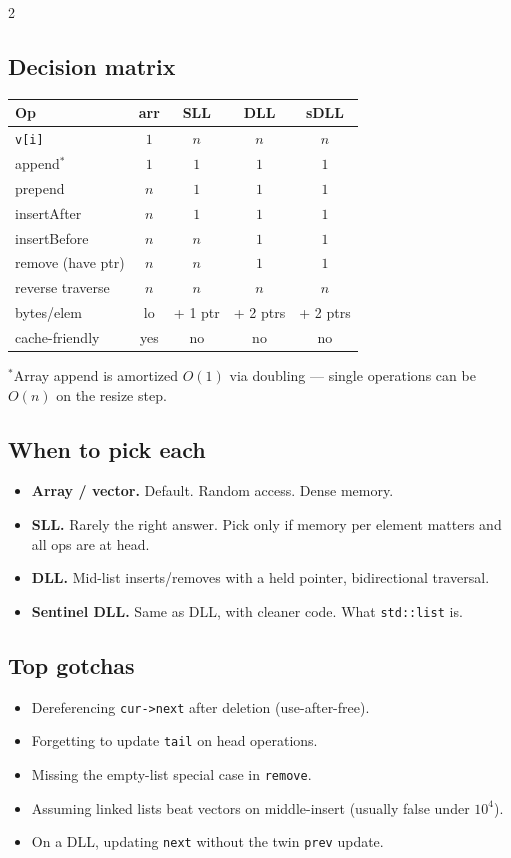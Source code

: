 \documentclass[10pt]{article}
\begin{document}
\begin{multicols}{2}
\subsection*{Decision matrix}
\begin{tabular}{@{}l|cccc@{}}
\textbf{Op} & \textbf{arr} & \textbf{SLL} & \textbf{DLL} & \textbf{sDLL}\\
\hline
\texttt{v[i]}         & $1$ & $n$ & $n$ & $n$\\
append$^\ast$         & $1$   & $1$ & $1$ & $1$\\
prepend               & $n$ & $1$ & $1$ & $1$\\
insertAfter           & $n$ & $1$ & $1$ & $1$\\
insertBefore          & $n$ & $n$ & $1$ & $1$\\
remove (have ptr)     & $n$ & $n$ & $1$ & $1$\\
reverse traverse      & $n$ & $n$ & $n$ & $n$\\
bytes/elem            & lo  & + 1 ptr & + 2 ptrs & + 2 ptrs\\
cache-friendly        & yes & no  & no  & no
\end{tabular}

\smallskip
$^\ast$Array append is amortized $O(1)$ via doubling --- single
operations can be $O(n)$ on the resize step.

\subsection*{When to pick each}
\begin{itemize}
    \item \textbf{Array / vector.} Default. Random access. Dense
    memory.
    \item \textbf{SLL.} Rarely the right answer. Pick only if memory
    per element matters and all ops are at head.
    \item \textbf{DLL.} Mid-list inserts/removes with a held pointer,
    bidirectional traversal.
    \item \textbf{Sentinel DLL.} Same as DLL, with cleaner code. What
    \texttt{std::list} is.
\end{itemize}

\subsection*{Top gotchas}
\begin{itemize}
    \item Dereferencing \texttt{cur->next} after deletion (use-after-free).
    \item Forgetting to update \texttt{tail} on head operations.
    \item Missing the empty-list special case in \texttt{remove}.
    \item Assuming linked lists beat vectors on middle-insert (usually
    false under $10^4$).
    \item On a DLL, updating \texttt{next} without the twin
    \texttt{prev} update.
\end{itemize}

\end{multicols}
\end{document}
